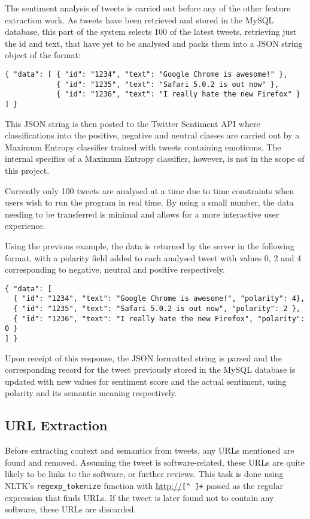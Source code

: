 The sentiment analysis of tweets is carried out before any of the other feature extraction work. As tweets have been retrieved and stored in the MySQL database, this part of the system selects 100 of the latest tweets, retrieving just the id and text, that have yet to be analysed and packs them into a JSON string object of the format:

\begin{verbatim}
{ "data": [ { "id": "1234", "text": "Google Chrome is awesome!" },
            { "id": "1235", "text": "Safari 5.0.2 is out now" },
            { "id": "1236", "text": "I really hate the new Firefox" } ] }
\end{verbatim}

This JSON string is then posted to the Twitter Sentiment API where classifications into the positive, negative and neutral classes are carried out by a Maximum Entropy classifier trained with tweets containing emoticons. The internal specifics of a Maximum Entropy classifier, however, is not in the scope of this project. %

Currently only 100 tweets are analysed at a time due to time constraints when users wish to run the program in real time. By using a small number, the data needing to be transferred is minimal and allows for a more interactive user experience.

Using the previous example, the data is returned by the server in the following format, with a polarity field added to each analysed tweet with values 0, 2 and 4 corresponding to negative, neutral and positive respectively.
\begin{verbatim}
{ "data": [ 
  { "id": "1234", "text": "Google Chrome is awesome!", "polarity": 4},
  { "id": "1235", "text": "Safari 5.0.2 is out now", "polarity": 2 },
  { "id": "1236", "text": "I really hate the new Firefox", "polarity": 0 } 
] }
\end{verbatim}

Upon receipt of this response, the JSON formatted string is parsed and the corresponding record for the tweet previously stored in the MySQL database is updated with new values for sentiment score and the actual sentiment, using polarity and its semantic meaning respectively.

\subsection{URL Extraction}
Before extracting context and semantics from tweets, any URLs mentioned are found and removed. Assuming the tweet is software-related, these URLs are quite likely to be links to the software, or further reviews. This task is done using NLTK's \texttt{regexp\_tokenize} function with \url{http://}\verb/[^ ]+/ passed as the regular expression that finds URLs. If the tweet is later found not to contain any software, these URLs are discarded.

